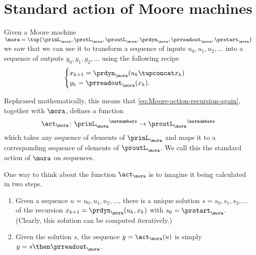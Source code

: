 
\section{Standard action of Moore machines}
\label{sec:Moore-acting-on-sequences}

Given a Moore machine $\mora = \tup{\prinL_\mora,\prstL_\mora,\proutL_\mora,\prdyn_\mora,\prreadout_\mora,\prstart_\mora}$
we saw that we can use it to transform a sequence of inputs $u_0, u_1, u_2, \dots$ into a sequence of outputs $y_0, y_1, y_2, \dots$ using the following recipe
\begin{equation}
    \label{eq:Moore-action-recursion-again}
    \begin{cases}
        x_{k+1} = \prdyn_\mora(u_k \tupconcat x_k) \\
        y_{k}   = \prreadout_\mora(x_{k}).
    \end{cases}
\end{equation}

Rephrased mathematically, this means that \cref{eq:Moore-action-recursion-again}, together with $\mora$, defines a function
\begin{equation*}
\act_{\mora} \colon {\prinL_\mora}^\natnumbers \to {\proutL_\mora}^\natnumbers
\end{equation*}
which takes any sequence  of elements of $\prinL_\mora$ and maps it to a corresponding sequence  of elements of $\proutL_\mora$.  We call this the standard action of $\mora$ on sequences.


\begin{remark}
    \label{re:moore-action-two-steps}
    One way to think about the function $\act_{\mora}$ is to imagine it being calculated in two steps.
    \begin{enumerate}
        \item Given a sequence $u = u_0, u_1, u_2, \dots$, there is a unique solution $s = s_0, s_1, s_2, \dots$ of the recursion $x_{k+1} = \prdyn_\mora(u_k, x_k)$ with $s_0 = \prstart_\mora$. (Clearly, this solution can be computed iteratively.)
        \item Given the solution $s$, the sequence $y = \act_{\mora}(u)$ is simply $y = s \then \prreadout_\mora$.
    \end{enumerate}
\end{remark}

